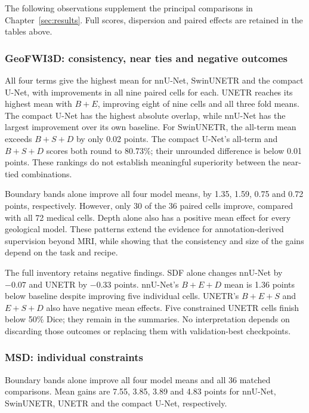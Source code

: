 \documentclass[12pt,a4paper]{article}
\begin{document}
\label{sec:secondary-objective-results}

The following observations supplement the principal comparisons in
Chapter~\ref{sec:results}. Full scores, dispersion and paired effects
are retained in the tables above.


\subsubsection*{GeoFWI3D: consistency, near ties and negative outcomes}

All four terms give the highest mean for nnU-Net, SwinUNETR and the
compact U-Net, with improvements in all nine paired cells for each.
UNETR reaches its highest mean with $B+E$, improving eight of nine
cells and all three fold means. The compact U-Net has the highest
absolute overlap, while nnU-Net has the largest improvement over its
own baseline. For SwinUNETR, the all-term mean exceeds $B+S+D$ by
only 0.02 points. The compact U-Net's all-term and $B+S+D$ scores
both round to 80.73\%; their unrounded difference is below 0.01
points. These rankings do not establish meaningful superiority
between the near-tied combinations.

Boundary bands alone improve all four model means, by 1.35, 1.59,
0.75 and 0.72 points, respectively. However, only 30 of the 36 paired
cells improve, compared with all 72 medical cells. Depth alone also
has a positive mean effect for every geological model. These patterns
extend the evidence for annotation-derived supervision beyond MRI,
while showing that the consistency and size of the gains depend on
the task and recipe.

The full inventory retains negative findings. SDF alone changes
nnU-Net by $-0.07$ and UNETR by $-0.33$ points. nnU-Net's
$B+E+D$ mean is 1.36 points below baseline despite improving five
individual cells. UNETR's $B+E+S$ and $E+S+D$ also have negative
mean effects. Five constrained UNETR cells finish below 50\% Dice;
they remain in the summaries. No interpretation depends on discarding
those outcomes or replacing them with validation-best checkpoints.

\subsubsection*{MSD: individual constraints}

Boundary bands alone improve all four model means and all 36 matched
comparisons. Mean gains are 7.55, 3.85, 3.89 and 4.83 points for
nnU-Net, SwinUNETR, UNETR and the compact U-Net, respectively.
\end{document}
